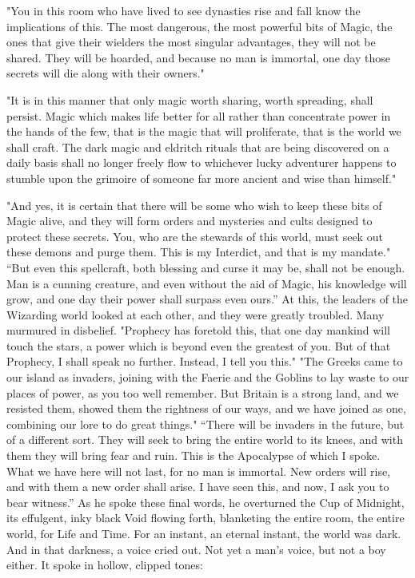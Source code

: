 "You in this room who have lived to see dynasties rise and fall know the implications of this. The most dangerous, the most powerful bits of Magic, the ones that give their wielders the most singular advantages, they will not be shared. They will be hoarded, and because no man is immortal, one day those secrets will die along with their owners."

"It is in this manner that only magic worth sharing, worth spreading, shall persist. Magic which makes life better for all rather than concentrate power in the hands of the few, that is the magic that will proliferate, that is the world we shall craft. The dark magic and eldritch rituals that are being discovered on a daily basis shall no longer freely flow to whichever lucky adventurer happens to stumble upon the grimoire of someone far more ancient and wise than himself."

"And yes, it is certain that there will be some who wish to keep these bits of Magic alive, and they will form orders and mysteries and cults designed to protect these secrets. You, who are the stewards of this world, must seek out these demons and purge them. This is my Interdict, and that is my mandate."
\SmallVSpace
“But even this spellcraft, both blessing and curse it may be, shall not be enough. Man is a cunning creature, and even without the aid of Magic, his knowledge will grow, and one day their power shall surpass even ours.”
\SmallVSpace
At this, the leaders of the Wizarding world looked at each other, and they were greatly troubled. Many murmured in disbelief.
\SmallVSpace
"Prophecy has foretold this, that one day mankind will touch the stars, a power which is beyond even the greatest of you. But of that Prophecy, I shall speak no further. Instead, I tell you this."
\SmallVSpace
"The Greeks came to our island as invaders, joining with the Faerie and the Goblins to lay waste to our places of power, as you too well remember. But Britain is a strong land, and we resisted them, showed them the rightness of our ways, and we have joined as one, combining our lore to do great things."
\SmallVSpace
“There will be invaders in the future, but of a different sort. They will seek to bring the entire world to its knees, and with them they will bring fear and ruin. This is the Apocalypse of which I spoke. What we have here will not last, for no man is immortal. New orders will rise, and with them a new order shall arise. I have seen this, and now, I ask you to bear witness.”
\SomeVSpace
As he spoke these final words, he overturned the Cup of Midnight, its effulgent, inky black Void flowing forth, blanketing the entire room, the entire world, for Life and Time. For an instant, an eternal instant, the world was dark. And in that darkness, a voice cried out. Not yet a man’s voice, but not a boy either. It spoke in hollow, clipped tones:

